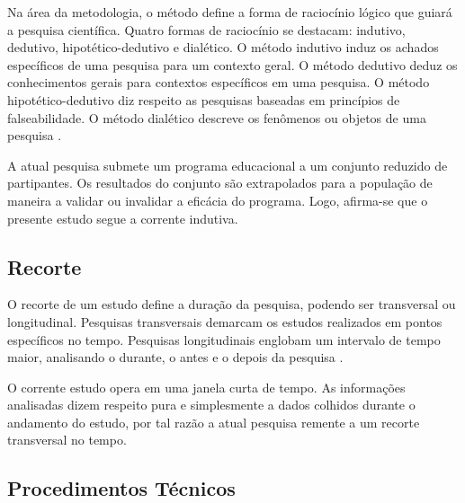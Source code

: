 Na área da metodologia, o método define a forma de raciocínio lógico que guiará a pesquisa científica. Quatro formas de raciocínio se destacam: indutivo, dedutivo, hipotético-dedutivo e dialético. O método indutivo induz os achados específicos de uma pesquisa para um contexto geral. O método dedutivo deduz os conhecimentos gerais para contextos específicos em uma pesquisa. O método hipotético-dedutivo diz respeito as pesquisas baseadas em princípios de falseabilidade. O método dialético descreve os fenômenos ou objetos de uma pesquisa \cite{marconi2003lakatos}.  

A atual pesquisa submete um programa educacional a um conjunto reduzido de partipantes. Os resultados do conjunto são extrapolados para a população de maneira a validar ou invalidar a eficácia do programa. Logo, afirma-se que o presente estudo segue a corrente indutiva. 


\subsection{Recorte}\label{sub:recorte}

\vspace{-0.13cm}



O recorte de um estudo define a duração da pesquisa, podendo ser transversal ou longitudinal. Pesquisas transversais demarcam os estudos realizados em pontos específicos no tempo. Pesquisas longitudinais englobam um intervalo de tempo maior, analisando o durante, o antes e o depois da pesquisa \cite{hochman2005desenhos}. 

O corrente estudo opera em uma janela curta de tempo. As informações analisadas dizem respeito pura e simplesmente a dados colhidos durante o andamento do estudo, por tal razão a atual pesquisa remente a um recorte transversal no tempo. 











\subsection{Procedimentos Técnicos}\label{sub:procedimentos}

\vspace{-0.13cm}


